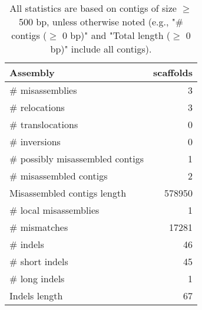 \documentclass[12pt,a4paper]{article}
\begin{document}
\begin{table}[ht]
\begin{center}
\caption{All statistics are based on contigs of size $\geq$ 500 bp, unless otherwise noted (e.g., "\# contigs ($\geq$ 0 bp)" and "Total length ($\geq$ 0 bp)" include all contigs).}
\begin{tabular}{|l*{1}{|r}|}
\hline
Assembly & scaffolds \\ \hline
\# misassemblies & 3 \\ \hline
\hspace{5mm}\# relocations & 3 \\ \hline
\hspace{5mm}\# translocations & 0 \\ \hline
\hspace{5mm}\# inversions & 0 \\ \hline
\# possibly misassembled contigs & 1 \\ \hline
\# misassembled contigs & 2 \\ \hline
Misassembled contigs length & 578950 \\ \hline
\# local misassemblies & 1 \\ \hline
\# mismatches & 17281 \\ \hline
\# indels & 46 \\ \hline
\hspace{5mm}\# short indels & 45 \\ \hline
\hspace{5mm}\# long indels & 1 \\ \hline
Indels length & 67 \\ \hline
\end{tabular}
\end{center}
\end{table}
\end{document}
